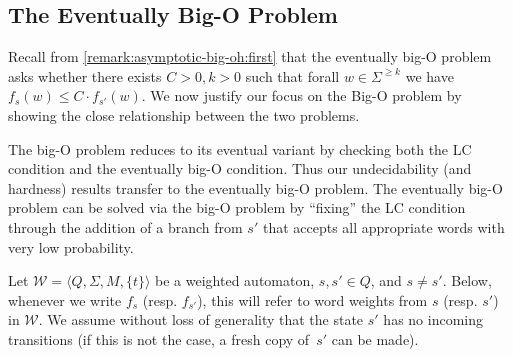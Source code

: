 \documentclass[10pt,a4paper]{amsart}
\numberwithin{equation}{section}
\theoremstyle{plain}
\theoremstyle{definition}
\theoremstyle{remark}
\newcommand\abra[1]{\langle #1 \rangle}
\newcommand\wa{\mathcal{W}}
\renewcommand\nu{f}
\begin{document}
\subsection{The Eventually Big-O Problem}
\label{remark:asymptotic-big-oh}
Recall from \cref{remark:asymptotic-big-oh:first} that the  eventually big-O problem asks whether there exists $C> 0, k> 0$ such that forall $w \in \Sigma^{\ge k}$ we have $ \nu_s(w) \le C \cdot \nu_{s'}(w)$. We now justify our focus on the Big-O problem by showing the close relationship between the two problems.

The big-O problem reduces to its eventual variant by checking both the LC condition and the eventually big-O condition. Thus our undecidability (and hardness) results
transfer to the eventually big-O problem. The eventually big-O problem can be solved via the big-O problem by ``fixing'' the LC condition through the addition of a branch from $s'$ that accepts all appropriate words with very low probability.

Let $\wa=\abra{Q,\Sigma,M,\{t\}}$ be a weighted automaton,  $s,s'\in Q$, and $s\neq s'$.
Below, whenever we write $\nu_s$ (resp. $\nu_{s'}$), this will refer to word weights from $s$ (resp. $s'$) in $\wa$.
We assume without loss of generality that the state $s'$ has no incoming transitions
(if this is not the case, a fresh copy of~$s'$ can be made).
\end{document}
